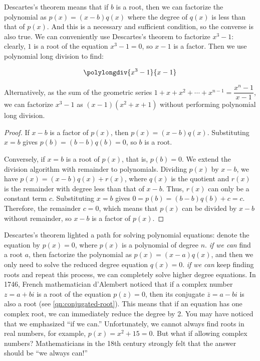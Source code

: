 \documentclass[b5paper]{article}
\begin{document}
Descartes's theorem means that if $b$ is a root, then we can factorize the polynomial as $p(x) = (x - b)q(x)$ where the degree of $q(x)$ is less than that of $p(x)$. And this is a necessary and sufficient condition, so the converse is also true. We can conveniently use Descartes's theorem to factorize $x^3 - 1$: clearly, $1$ is a root of the equation $x^3 - 1 = 0$, so $x - 1$ is a factor. Then we use polynomial long division to find:

\[
\polylongdiv{x^3-1}{x-1}
\]

Alternatively, as the sum of the geometric series $1 + x + x^2 + \dotsb + x^{n-1} = \dfrac{x^n - 1}{x - 1}$, we can factorize $x^3 - 1$ as $(x - 1)(x^2 + x + 1)$ without performing polynomial long division.

\begin{proof}
If $x - b$ is a factor of $p(x)$, then $p(x) = (x - b)q(x)$. Substituting $x = b$ gives $p(b) = (b - b)q(b) = 0$, so $b$ is a root.

Conversely, if $x = b$ is a root of $p(x)$, that is, $p(b) = 0$. We extend the division algorithm with remainder to polynomials. Dividing $p(x)$ by $x - b$, we have $p(x) = (x - b)q(x) + r(x)$, where $q(x)$ is the quotient and $r(x)$ is the remainder with degree less than that of $x - b$. Thus, $r(x)$ can only be a constant term $c$. Substituting $x = b$ gives $0 = p(b) = (b - b)q(b) + c = c$. Therefore, the remainder $c = 0$, which means that $p(x)$ can be divided by $x - b$ without remainder, so $x - b$ is a factor of $p(x)$.
\end{proof}

Descartes's theorem lighted a path for solving polynomial equations: denote the equation by $p(x) = 0$, where $p(x)$ is a polynomial of degree $n$. \emph{if we can} find a root $a$, then factorize the polynomial as $p(x) = (x - a)q(x)$, and then we only need to solve the reduced degree equation $q(x) = 0$. \emph{if we can} keep finding roots and repeat this process, we can completely solve higher degree equations. In 1746, French mathematician d'Alembert noticed that if a complex number $z = a + bi$ is a root of the equation $p(z) = 0$, then its conjugate $\overline{z} = a - bi$ is also a root (see \cref{qn:conjugated-root}). This means that if an equation has one complex root, we can immediately reduce the degree by 2. You may have noticed that we emphasized \enquote{if we can.} Unfortunately, we cannot always find roots in real numbers, for example, $p(x) = x^2 + 15 = 0$. But what if allowing complex numbers? Mathematicians in the 18th century strongly felt that the answer should be \enquote{we always can!}
\end{document}
